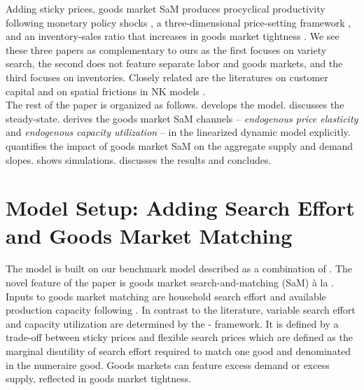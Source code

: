 \documentclass[12pt,3p,authoryear,review]{elsarticle}
\begin{document}
Adding sticky prices, goods market SaM produces procyclical productivity following monetary policy shocks \citep{qiuProcyclicalProductivityNew2022}, a three-dimensional price-setting framework \citep{michaillat2024beveridgean}, and an inventory-sales ratio that increases in goods market tightness \citep{den2024role}. We see these three papers as complementary to ours as the first focuses on variety search, the second does not feature separate labor and goods markets, and the third focuses on inventories. Closely related are the literatures on customer capital \citep{drozdUnderstandingInternationalPrices2012,gilchrist2017inflation,gourio2014customer,paciello2019price} and on spatial frictions in NK models \citep{schmitt2025hotelling}.\\%
The rest of the paper is organized as follows.  develops the model.  discusses the steady-state.  derives the goods market SaM channels -- \emph{endogenous price elasticity} and \emph{endogenous capacity utilization} -- in the linearized dynamic model explicitly.  quantifies the impact of goods market SaM on the aggregate supply and demand slopes.  shows simulations.  discusses the results and concludes.%
\section{Model Setup: Adding Search Effort and Goods Market Matching}\label{sec:model}%
The model is built on our benchmark model described as a combination of \cite{ercegOptimalMonetaryPolicy2000,gali2011unemployment,lesterHomeProductionSticky2014}. The novel feature of the paper is goods market search-and-matching (SaM) à la \cite{michaillatAggregateDemandIdle2015}. Inputs to goods market matching are household search effort and available production capacity following \cite{sun2024excess}. In contrast to the literature, variable search effort and capacity utilization are determined by the \cite{moenCompetitiveSearchEquilibrium1997}-\cite{rotembergMonopolisticPriceAdjustment1982} framework. It is defined by a trade-off between sticky prices and flexible search prices which are defined as the marginal disutility of search effort required to match one good and denominated in the numeraire good. Goods markets can feature excess demand or excess supply, reflected in goods market tightness.%
\end{document}
